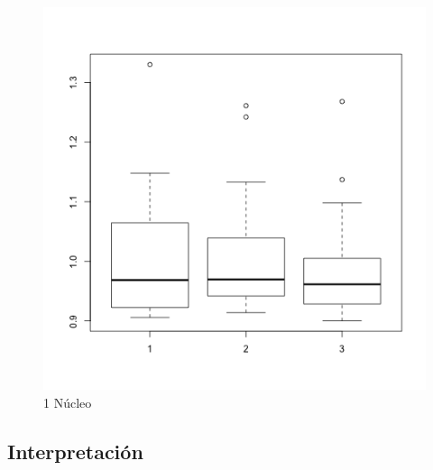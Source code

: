 \documentclass[a4paper]{article}
\begin{document}
\begin{figure}
\centering
\includegraphics[width=0.7\linewidth]{p3_t3}
\caption[1 Núcleo]{1 Núcleo}
\label{fig:p1 Núcleo}
\end{figure}

\subsection{Interpretación}
\end{document}
